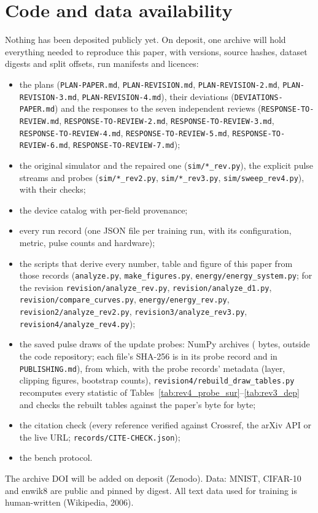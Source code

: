 








\section{Code and data availability}\label{sec:availability}
\begin{sloppypar}
Nothing has been deposited publicly yet. On deposit, one archive will hold everything needed to reproduce this paper, with
versions, source hashes, dataset digests and split offsets, run manifests and licences:
\begin{itemize}
\item the plans (\texttt{PLAN-PAPER.md}, \texttt{PLAN-REVISION.md}, \texttt{PLAN-REVISION-2.md},
      \texttt{PLAN-REVISION-3.md}, \texttt{PLAN-REVISION-4.md}), their deviations (\texttt{DEVIATIONS-PAPER.md}) and the responses to the seven
      independent reviews (\texttt{RESPONSE-TO-REVIEW.md}, \texttt{RESPONSE-TO-REVIEW-2.md},
      \texttt{RESPONSE-TO-REVIEW-3.md}, \texttt{RESPONSE-TO-REVIEW-4.md}, \texttt{RESPONSE-TO-REVIEW-5.md}, \texttt{RESPONSE-TO-REVIEW-6.md}, \texttt{RESPONSE-TO-REVIEW-7.md});
\item the original simulator and the repaired one (\texttt{sim/*\_rev.py}), the explicit pulse streams and probes
      (\texttt{sim/*\_rev2.py}, \texttt{sim/*\_rev3.py}, \texttt{sim/sweep\_rev4.py}), with their checks;
\item the device catalog with per-field provenance;
\item every run record (one JSON file per training run, with its configuration, metric, pulse counts and hardware);
\item the scripts that derive every number, table and figure of this paper from those records (\texttt{analyze.py},
      \texttt{make\_figures.py}, \texttt{energy/energy\_system.py}; for the revision \texttt{revision/analyze\_rev.py},
      \texttt{revision/analyze\_d1.py}, \texttt{revision/compare\_curves.py}, \texttt{energy/energy\_rev.py},
      \texttt{revision2/analyze\_rev2.py}, \texttt{revision3/analyze\_rev3.py}, \texttt{revision4/analyze\_rev4.py});
\item the saved pulse draws of the update probes: \RZDrawN{} NumPy archives (\RZDrawBytes{} bytes, outside the code
      repository; each file's SHA-256 is in its probe record and in \texttt{PUBLISHING.md}), from which, with the probe records' metadata (layer, clipping figures,
      bootstrap counts), \texttt{revision4/rebuild\_draw\_tables.py} recomputes every statistic of
      Tables~\ref{tab:rev4_probe_sur}--\ref{tab:rev3_dep} and checks the rebuilt tables against the paper's byte for byte;
\item the citation check (every reference verified against Crossref, the arXiv API or the live URL;
      \texttt{records/CITE-CHECK.json});
\item the bench protocol.
\end{itemize}
The archive DOI will be added on deposit (Zenodo). Data: MNIST, CIFAR-10 and enwik8 are public and pinned by digest. All text
data used for training is human-written (Wikipedia, 2006).


\end{sloppypar}
